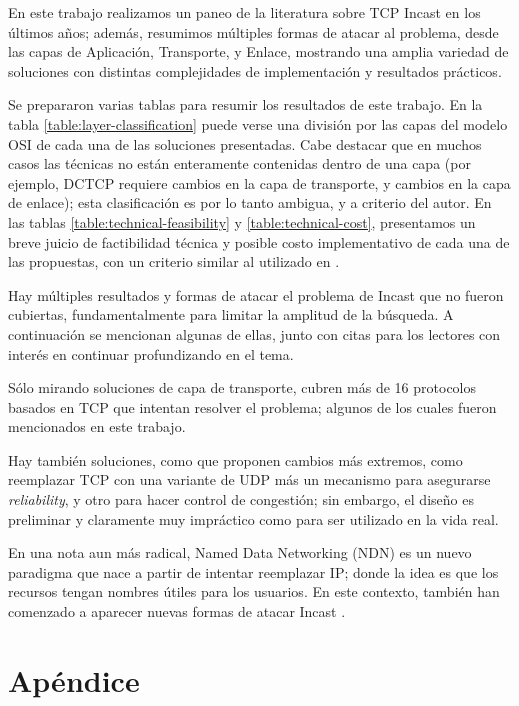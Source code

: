 \documentclass[runningheads,a4paper]{llncs}
\begin{document}
En este trabajo realizamos un paneo de la literatura sobre TCP Incast en los últimos años; además, resumimos múltiples formas de atacar al problema, desde las capas de Aplicación, Transporte, y Enlace, mostrando una amplia variedad de soluciones con distintas complejidades de implementación y resultados prácticos.

Se prepararon varias tablas para resumir los resultados de este trabajo. En la tabla \ref{table:layer-classification} puede verse una división por las capas del modelo OSI de cada una de las soluciones presentadas. Cabe destacar que en muchos casos las técnicas no están enteramente contenidas dentro de una capa (por ejemplo, DCTCP requiere cambios en la capa de transporte, y cambios en la capa de enlace); esta clasificación es por lo tanto ambigua, y a criterio del autor. En las tablas \ref{table:technical-feasibility} y \ref{table:technical-cost}, presentamos un breve juicio de factibilidad técnica y posible costo implementativo de cada una de las propuestas, con un criterio similar al utilizado en \cite{Ren_A_2014}.

Hay múltiples resultados y formas de atacar el problema de Incast que no fueron cubiertas, fundamentalmente para limitar la amplitud de la búsqueda. A continuación se mencionan algunas de ellas, junto con citas para los lectores con interés en continuar profundizando en el tema.

Sólo mirando soluciones de capa de transporte, \citet{Sreekumari_Transport_2016} cubren más de 16 protocolos basados en TCP que intentan resolver el problema; algunos de los cuales fueron mencionados en este trabajo.

Hay también soluciones, como \cite{Jiang_CodingBased_2012} que proponen cambios más extremos, como reemplazar TCP con una variante de UDP más un mecanismo para asegurarse \textit{reliability}, y otro para hacer control de congestión; sin embargo, el diseño es preliminar y claramente muy impráctico como para ser utilizado en la vida real.

En una nota aun más radical, Named Data Networking (NDN) \cite{Zhang_NDN_2014} es un nuevo paradigma que nace a partir de intentar reemplazar IP; donde la idea es que los recursos tengan nombres útiles para los usuarios. En este contexto, también han comenzado a aparecer nuevas formas de atacar Incast \cite{Zhou_CCM_2018}. 

\newpage

\section{Apéndice}
\end{document}
